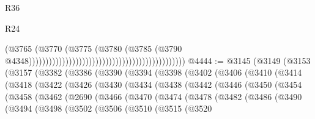 \begin{lexlean}{R36}
\begin{lexlean}{R24}
\begin{coremodule}
{{{{{{{{{{{{{{{{{{{{{{{{{{{{{{{{{{{{{{{{{{{{{{{{{{{{{{{{{{{{{{{{{{{{{{{{{{{{{{{{{{{{{{{{{{{{{{{{{{{{{{{{{{{{{{{{{{{{{{{{{{{{{{{{{{{{{{{{{{{{{{{{{{{{{{{{{{{{{{{{{{{{{{{{{{{{{{{{{{{{{{{{{{{{{{{{{{{                                                                                      (@3765
                                                                                        (@3770
                                                                                          (@3775
                                                                                            (@3780
                                                                                              (@3785
                                                                                                (@3790
                                                                                                  @4348)))))))))))))))))))))))))))))))))))))))))))))))
@4444 := @3145
    (@3149
      (@3153
        (@3157
          (@3382
            (@3386
              (@3390
                (@3394
                  (@3398
                    (@3402
                      (@3406
                        (@3410
                          (@3414
                            (@3418
                              (@3422
                                (@3426
                                  (@3430
                                    (@3434
                                      (@3438
                                        (@3442
                                          (@3446
                                            (@3450
                                              (@3454
                                                (@3458
                                                  (@3462
                                                    (@2690
                                                      (@3466
                                                        (@3470
                                                          (@3474
                                                            (@3478
                                                              (@3482
                                                                (@3486
                                                                  (@3490
                                                                    (@3494
                                                                      (@3498
                                                                        (@3502
                                                                          (@3506
                                                                            (@3510
                                                                              (@3515
                                                                                (@3520
}}}}}}}}}}}}}}}}}}}}}}}}}}}}}}}}}}}}}}}}}}}}}}}}}}}}}}}}}}}}}}}}}}}}}}}}}}}}}}}}}}}}}}}}}}}}}}}}}}}}}}}}}}}}}}}}}}}}}}}}}}}}}}}}}}}}}}}}}}}}}}}}}}}}}}}}}}}}}}}}}}}}}}}}}}}}}}}}}}}}}}}}}}}}}}}}}}}
\end{coremodule}
\end{lexlean}
\end{lexlean}
